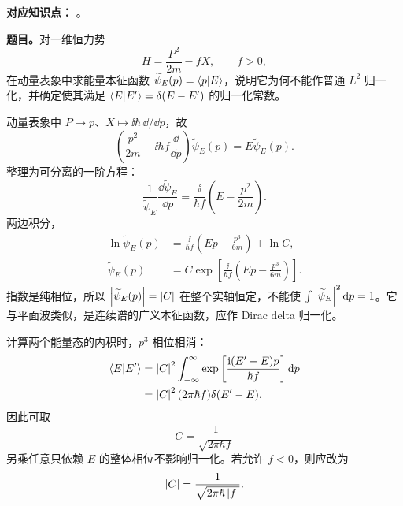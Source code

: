 
\textbf{对应知识点：}
。

\textbf{题目。}对一维恒力势
\begin{equation}
  H=\frac{P^2}{2m}-fX,
  \qquad f>0,
  \label{eq:QM-C04-S03-E02-hamiltonian}
\end{equation}
在动量表象中求能量本征函数 $\widetilde\psi_E(p)=\left\langle p \middle| E \right\rangle$，说明它为何不能作普通 $L^2$ 归一化，并确定使其满足 $\left\langle E \middle| E' \right\rangle=\delta(E-E')$ 的归一化常数。

\begin{checkedsolution}
动量表象中 $P\mapsto p$、$X\mapsto\ii\hbar\,\dd/\dd p$，故
\begin{equation}
  \left(\frac{p^2}{2m}-\ii\hbar f\frac{\dd}{\dd p}\right)
  \widetilde\psi_E(p)=E\widetilde\psi_E(p).
  \label{eq:QM-C04-S03-E02-eigen-equation}
\end{equation}
整理为可分离的一阶方程：
\begin{equation}
  \frac{1}{\widetilde\psi_E}
  \frac{\dd\widetilde\psi_E}{\dd p}
  =\frac{\ii}{\hbar f}
    \left(E-\frac{p^2}{2m}\right).
  \label{eq:QM-C04-S03-E02-separated-ode}
\end{equation}
两边积分，
\begin{align}
  \ln\widetilde\psi_E(p)
  &=\frac{\ii}{\hbar f}
    \left(Ep-\frac{p^3}{6m}\right)+\ln C,
  \label{eq:QM-C04-S03-E02-log-solution}\\
  \widetilde\psi_E(p)
  &=\boxed{C\exp\left[\frac{\ii}{\hbar f}
    \left(Ep-\frac{p^3}{6m}\right)\right]}.
  \label{eq:QM-C04-S03-E02-solution}
\end{align}
指数是纯相位，所以 $\left|\widetilde\psi_E(p)\right|=\left|C\right|$ 在整个实轴恒定，不能使 $\int\left|\widetilde\psi_E\right|^2\mathop{}\!\mathrm{d} p=1$。它与平面波类似，是连续谱的广义本征函数，应作 Dirac delta 归一化。

计算两个能量态的内积时，$p^3$ 相位相消：
\begin{align}
  \left\langle E \middle| E' \right\rangle
  &=\left|C\right|^2\int_{-\infty}^{\infty}
    \exp\left[\frac{\mathrm{i}(E'-E)p}{\hbar f}\right]\mathop{}\!\mathrm{d} p\notag\\
  &=\left|C\right|^2(2\pi\hbar f)\delta(E'-E).
  \label{eq:QM-C04-S03-E02-delta-normalization}
\end{align}
因此可取
\begin{equation}
  \boxed{C=\frac1{\sqrt{2\pi\hbar f}}}
  \label{eq:QM-C04-S03-E02-normalization-constant}
\end{equation}
另乘任意只依赖 $E$ 的整体相位不影响归一化。若允许 $f<0$，则应改为
\begin{equation}
  \left|C\right|=\frac1{\sqrt{2\pi\hbar\left|f\right|}}.
  \label{eq:QM-C04-S03-E02-normalization-general-force}
\end{equation}
\end{checkedsolution}

